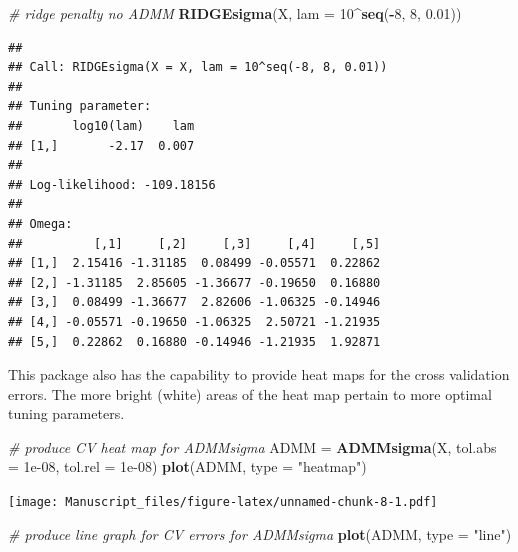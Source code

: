 \documentclass[12pt,]{book}
\newenvironment{Shaded}{\begin{snugshade}}{\end{snugshade}}
\newcommand{\CommentTok}[1]{\textcolor[rgb]{0.56,0.35,0.01}{\textit{#1}}}
\newcommand{\DataTypeTok}[1]{\textcolor[rgb]{0.13,0.29,0.53}{#1}}
\newcommand{\DecValTok}[1]{\textcolor[rgb]{0.00,0.00,0.81}{#1}}
\newcommand{\FloatTok}[1]{\textcolor[rgb]{0.00,0.00,0.81}{#1}}
\newcommand{\KeywordTok}[1]{\textcolor[rgb]{0.13,0.29,0.53}{\textbf{#1}}}
\newcommand{\NormalTok}[1]{#1}
\newcommand{\OperatorTok}[1]{\textcolor[rgb]{0.81,0.36,0.00}{\textbf{#1}}}
\newcommand{\StringTok}[1]{\textcolor[rgb]{0.31,0.60,0.02}{#1}}
\theoremstyle{definition}
\theoremstyle{definition}
\theoremstyle{definition}
\theoremstyle{remark}
\begin{document}
\begin{Shaded}
\begin{Highlighting}[]
\CommentTok{# ridge penalty no ADMM}
\KeywordTok{RIDGEsigma}\NormalTok{(X, }\DataTypeTok{lam =} \DecValTok{10}\OperatorTok{^}\KeywordTok{seq}\NormalTok{(}\OperatorTok{-}\DecValTok{8}\NormalTok{, }\DecValTok{8}\NormalTok{, }\FloatTok{0.01}\NormalTok{))}
\end{Highlighting}
\end{Shaded}

\begin{verbatim}
## 
## Call: RIDGEsigma(X = X, lam = 10^seq(-8, 8, 0.01))
## 
## Tuning parameter:
##       log10(lam)    lam
## [1,]       -2.17  0.007
## 
## Log-likelihood: -109.18156
## 
## Omega:
##          [,1]     [,2]     [,3]     [,4]     [,5]
## [1,]  2.15416 -1.31185  0.08499 -0.05571  0.22862
## [2,] -1.31185  2.85605 -1.36677 -0.19650  0.16880
## [3,]  0.08499 -1.36677  2.82606 -1.06325 -0.14946
## [4,] -0.05571 -0.19650 -1.06325  2.50721 -1.21935
## [5,]  0.22862  0.16880 -0.14946 -1.21935  1.92871
\end{verbatim}

\newpage

This package also has the capability to provide heat maps for the cross
validation errors. The more bright (white) areas of the heat map pertain
to more optimal tuning parameters.

\vspace{0.5cm}

\begin{Shaded}
\begin{Highlighting}[]
\CommentTok{# produce CV heat map for ADMMsigma}
\NormalTok{ADMM =}\StringTok{ }\KeywordTok{ADMMsigma}\NormalTok{(X, }\DataTypeTok{tol.abs =} \FloatTok{1e-08}\NormalTok{, }\DataTypeTok{tol.rel =} \FloatTok{1e-08}\NormalTok{)}
\KeywordTok{plot}\NormalTok{(ADMM, }\DataTypeTok{type =} \StringTok{"heatmap"}\NormalTok{)}
\end{Highlighting}
\end{Shaded}

\texttt{[image: Manuscript\_files/figure-latex/unnamed-chunk-8-1.pdf]}
\newpage

\begin{Shaded}
\begin{Highlighting}[]
\CommentTok{# produce line graph for CV errors for ADMMsigma}
\KeywordTok{plot}\NormalTok{(ADMM, }\DataTypeTok{type =} \StringTok{"line"}\NormalTok{)}
\end{Highlighting}
\end{Shaded}
\end{document}
